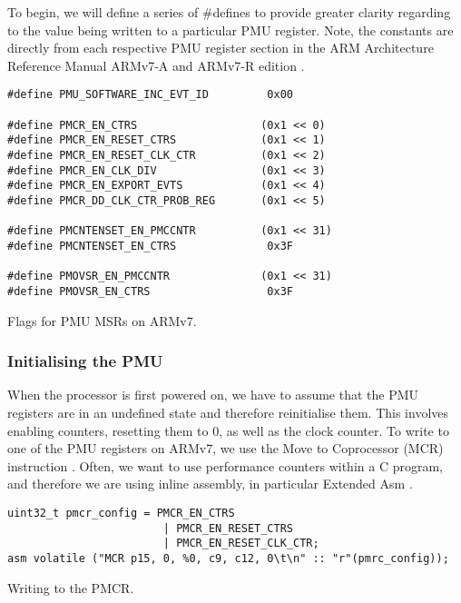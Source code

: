 {\dsp

To begin, we will define a series of \#defines to provide greater clarity regarding to the value being written to a particular PMU register. Note, the constants are directly from each respective PMU register section in the ARM Architecture Reference Manual ARMv7-A and ARMv7-R edition \cite{DocsArvm7}.

\begin{listing}
    \begin{verbatim}
#define PMU_SOFTWARE_INC_EVT_ID         0x00

#define PMCR_EN_CTRS                   (0x1 << 0)
#define PMCR_EN_RESET_CTRS             (0x1 << 1)
#define PMCR_EN_RESET_CLK_CTR          (0x1 << 2)
#define PMCR_EN_CLK_DIV                (0x1 << 3)
#define PMCR_EN_EXPORT_EVTS            (0x1 << 4)
#define PMCR_DD_CLK_CTR_PROB_REG       (0x1 << 5)

#define PMCNTENSET_EN_PMCCNTR          (0x1 << 31)
#define PMCNTENSET_EN_CTRS              0x3F

#define PMOVSR_EN_PMCCNTR              (0x1 << 31)
#define PMOVSR_EN_CTRS                  0x3F
    \end{verbatim}
    \caption{Flags for PMU MSRs on ARMv7.}
\end{listing}

\subsubsection{Initialising the PMU}

When the processor is first powered on, we have to assume that the PMU registers are in an undefined state and therefore reinitialise them. This involves enabling counters, resetting them to 0, as well as the clock counter. To write to one of the PMU registers on ARMv7, we use the Move to Coprocessor (MCR) instruction \cite{DocsArmMCR}. Often, we want to use performance counters within a C program, and therefore we are using inline assembly, in particular Extended Asm \cite{DocsGCCExtendedAsm}.

\begin{listing}
    \begin{verbatim}
uint32_t pmcr_config = PMCR_EN_CTRS
                        | PMCR_EN_RESET_CTRS
                        | PMCR_EN_RESET_CLK_CTR;
asm volatile ("MCR p15, 0, %0, c9, c12, 0\t\n" :: "r"(pmrc_config));
    \end{verbatim}
    \caption{Writing to the PMCR.}
\end{listing}

}
